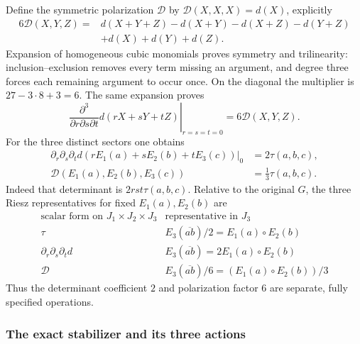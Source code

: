\documentclass[11pt]{article}
\theoremstyle{definition}
\begin{document}
Define the symmetric polarization $\mathcal D$ by
$\mathcal D(X,X,X)=d(X)$, explicitly
\begin{align}
 6\mathcal D(X,Y,Z)={}&d(X+Y+Z)-d(X+Y)-d(X+Z)-d(Y+Z)
 \nonumber\\&+d(X)+d(Y)+d(Z).
 \label{att:eq:polarization}
\end{align}
Expansion of homogeneous cubic monomials proves symmetry and
trilinearity: inclusion--exclusion removes every term missing an
argument, and degree three forces each remaining argument to occur
once. On the diagonal the multiplier is $27-3\cdot8+3=6$.
The same expansion proves
\[
 \left.\frac{\partial^3}{\partial r\partial s\partial t}
 d(rX+sY+tZ)\right|_{r=s=t=0}=6\mathcal D(X,Y,Z).
\]
For the three distinct sectors one obtains
\begin{equation}
\begin{split}
 \left.\partial_r\partial_s\partial_t
 d(rE_1(a)+sE_2(b)+tE_3(c))\right|_0&=2\tau(a,b,c),\\
 \mathcal D(E_1(a),E_2(b),E_3(c))&=\tfrac13\tau(a,b,c).
\end{split}
 \label{att:eq:factor-six}
\end{equation}
Indeed that determinant is $2rst\tau(a,b,c)$. Relative to the original
$G$, the three Riesz representatives for fixed $E_1(a),E_2(b)$ are
\[
\begin{array}{c|c}
\text{scalar form on }J_1\times J_2\times J_3&
             \text{representative in }J_3\\\hline
\tau&E_3(\overline{ab})/2=E_1(a)\circ E_2(b)\\
\partial_r\partial_s\partial_t d&
                  E_3(\overline{ab})=2E_1(a)\circ E_2(b)\\
\mathcal D&E_3(\overline{ab})/6=(E_1(a)\circ E_2(b))/3
\end{array}
\]
Thus the determinant coefficient $2$ and polarization factor $6$
are separate, fully specified operations.

\subsubsection{The exact stabilizer and its three actions}
\end{document}
